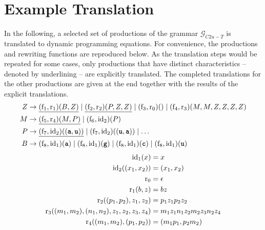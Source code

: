 \documentclass[
    a4paper,
    12pt,
    twoside,
    BCOR=12mm,
    parskip=half,
    chapterprefix,
    numbers=noenddot,
    bibliography=totoc
]{scrbook}
\begin{document}
\section{Example Translation}
\label{sec:ex_translation}

In the following, a selected set of productions of the grammar $\mathcal{G}_{C2u-T}$ is translated to dynamic programming equations. For convenience, the productions and rewriting functions are reproduced below. As the translation steps would be repeated for some cases, only productions that have distinct characteristics -- denoted by underlining -- are explicitly translated. The completed translations for the other productions are given at the end together with the results of the explicit translations.	
\begin{align*}
    Z &\to \underline{(\op{f}_1,\op{r}_1) (B,Z) }
        \mid \underline{(\op{f}_2,\op{r}_2) (P,Z,Z) }
        \mid (\op{f}_3,\op{r}_0) ()
        \mid (\op{f}_4,\op{r}_3) (M,M,Z,Z,Z,Z)\\
    M &\to \underline{(\op{f}_5,\op{r}_4) (M,P) } \mid (\op{f}_6,\op{id}_2) (P)\\
    P &\to \underline{
      (\op{f}_7,\op{id}_2)((\ts{a},\ts{u})) } \mid
      (\op{f}_7,\op{id}_2)((\ts{u},\ts{a})) \mid
      \ldots\\
    B &\to 
      (\op{f}_8,\op{id}_1) (\ts{a}) \mid
      (\op{f}_8,\op{id}_1) (\ts{g}) \mid
      (\op{f}_8,\op{id}_1) (\ts{c}) \mid
      (\op{f}_8,\op{id}_1) (\ts{u})
\end{align*}		
\begin{align*}
  \mathrm{id}_1(x) &= x\\
  \mathrm{id}_2((x_1,x_2)) &= (x_1,x_2)\\
  \mathrm{r}_0 &= \epsilon\\
  \mathrm{r}_1(b,z) &= bz\\
  \mathrm{r}_2((p_1,p_2),z_1,z_2) &= p_1 z_1 p_2 z_2\\
  \mathrm{r}_3((m_1,m_2),(n_1,n_2),z_1,z_2,z_3,z_4) &= m_1 z_1 n_1 z_2 m_2 z_3 n_2 z_4\\
  \mathrm{r}_4((m_1,m_2),(p_1,p_2)) &= (m_1 p_1,p_2 m_2)
\end{align*}
\end{document}
